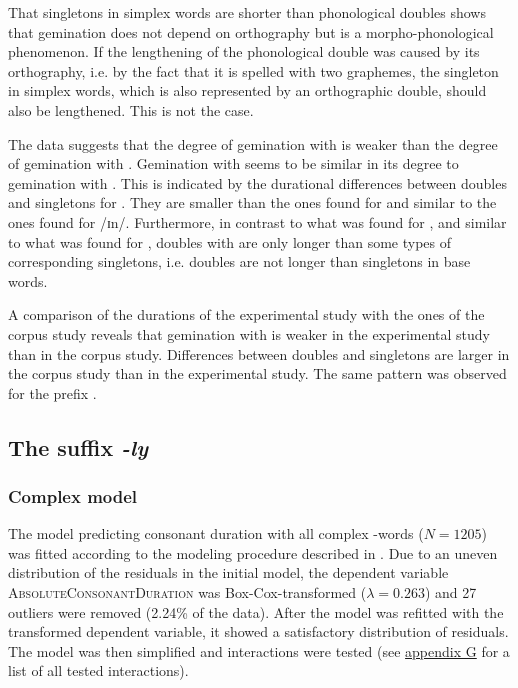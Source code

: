 That singletons in simplex words are shorter than phonological doubles shows that gemination does not depend on orthography but is a morpho-phonological phenomenon. If the lengthening of the phonological double was caused by its orthography, i.e. by the fact that it is spelled with two graphemes, the singleton in simplex words, which is also represented by an orthographic double, should also be lengthened. This is not the case. 


The data suggests that the degree of gemination with  is weaker than the degree of gemination with . Gemination with  seems to be similar in its degree to gemination with . 
This is indicated by the durational differences between doubles and singletons for . They are smaller than the ones found for  and similar to the ones found for /ɪn/. 
Furthermore, in contrast to what was found for , and similar to what was found for , doubles with  are only longer than some types of corresponding singletons, i.e. doubles are not longer than singletons in base words.



A comparison of the durations of the experimental study with the ones of the corpus study reveals that gemination with  is weaker in the experimental study than in the corpus study. Differences between doubles and singletons are larger in the corpus study than in the experimental study. The same pattern was observed for the prefix .


\subsection{The suffix \textit{-ly} }

\subsubsection{Complex model}

The model predicting consonant duration with all complex -words ($N=1205$) was fitted according to the modeling procedure described in . Due to an uneven distribution of the residuals in the initial model, the dependent variable \textsc{AbsoluteConsonantDuration} was Box-Cox-transformed ($\lambda = 0.263$) and 27 outliers were removed (2.24\% of the data). 
After the model was refitted with the transformed dependent variable, it showed a satisfactory distribution of residuals. The model was then simplified and interactions were tested (see \hyperref[Appendix G Summaries of tested interactions in experimental study]{appendix G} for a list of all tested interactions). 

